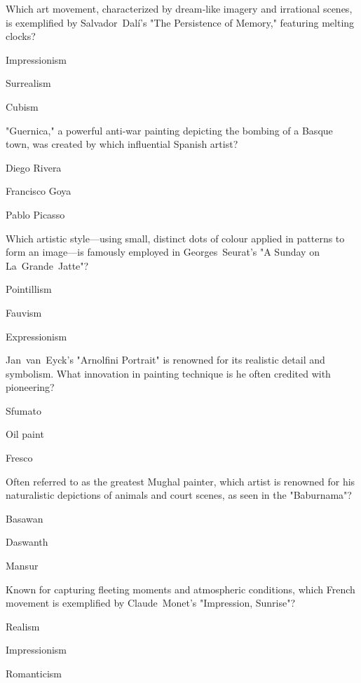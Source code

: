 
\begin{enhancedmcq}{Which art movement, characterized by dream‑like imagery and irrational scenes, is exemplified by Salvador Dalí's "The Persistence of Memory," featuring melting clocks?}
\item Impressionism
\item Surrealism
\item Cubism

\end{enhancedmcq}
\begin{enhancedmcq}{"Guernica," a powerful anti‑war painting depicting the bombing of a Basque town, was created by which influential Spanish artist?}
\item Diego Rivera
\item Francisco Goya
\item Pablo Picasso

\end{enhancedmcq}
\begin{enhancedmcq}{Which artistic style—using small, distinct dots of colour applied in patterns to form an image—is famously employed in Georges Seurat's "A Sunday on La Grande Jatte"?}
\item Pointillism
\item Fauvism
\item Expressionism

\end{enhancedmcq}
\begin{enhancedmcq}{Jan van Eyck's "Arnolfini Portrait" is renowned for its realistic detail and symbolism. What innovation in painting technique is he often credited with pioneering?}
\item Sfumato
\item Oil paint
\item Fresco

\end{enhancedmcq}
\begin{enhancedmcq}{Often referred to as the greatest Mughal painter, which artist is renowned for his naturalistic depictions of animals and court scenes, as seen in the "Baburnama"?}
\item Basawan
\item Daswanth
\item Mansur

\end{enhancedmcq}
\begin{enhancedmcq}{Known for capturing fleeting moments and atmospheric conditions, which French movement is exemplified by Claude Monet's "Impression, Sunrise"?}
\item Realism
\item Impressionism
\item Romanticism

\end{enhancedmcq}
